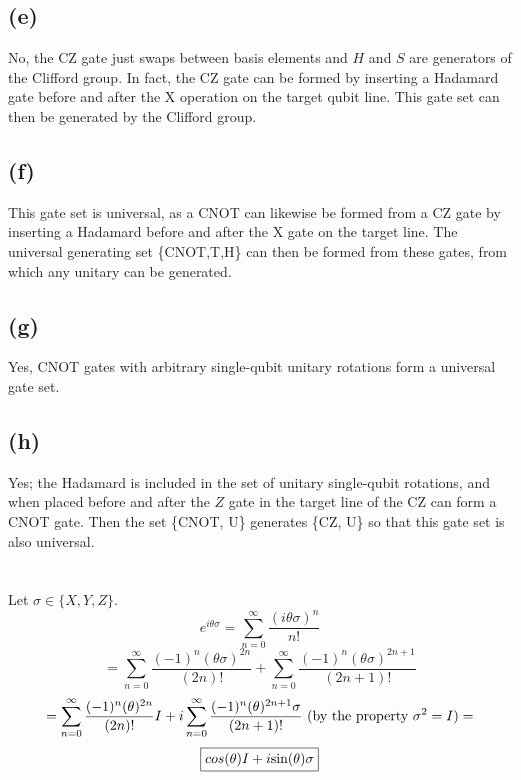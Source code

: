 \documentclass{article}
\begin{document}
\subsection*{(e)}

No, the CZ gate just swaps between basis elements and $H$ and $S$ are generators of the Clifford group. In fact, the CZ gate can be formed by inserting a Hadamard gate before and after the X operation on the target qubit line. This gate set can then be generated by the Clifford  group.

\subsection*{(f)}

This gate set is universal, as a CNOT can likewise be formed from a CZ gate by inserting a Hadamard before and after the X gate on the target line. The universal generating set \{CNOT,T,H\} can then be formed from these gates, from which any unitary can be generated.

\subsection*{(g)}

Yes, CNOT gates with arbitrary single-qubit unitary rotations form a universal gate set.

\subsection*{(h)}

Yes; the Hadamard is included in the set of unitary single-qubit rotations, and when placed before and after the $Z$ gate in the target line of the CZ can form a CNOT gate. Then the set \{CNOT, U\} generates \{CZ, U\} so that this gate set is also universal.

\section{}

Let $\sigma\in\{X,Y,Z\}$.
$$e^{i\theta\sigma}=\sum_{n=0}^{\infty}\frac{(i\theta\sigma)^n}{n!}$$
$$=\sum_{n=0}^{\infty}\frac{(-1)^n(\theta\sigma)^{2n}}{(2n)!}+\sum_{n=0}^{\infty}\frac{(-1)^n(\theta\sigma)^{2n+1}}{(2n+1)!}$$
$$=\sum_{n=0}^{\infty}\frac{(-1)^n(\theta)^{2n}}{(2n)!}I+i\sum_{n=0}^{\infty}\frac{(-1)^n(\theta)^{2n+1}\sigma}{(2n+1)!}\textnormal{ (by the property }\sigma^2=I)=$$
$$
\boxed{cos(\theta)I+i\textnormal{sin}(\theta)\sigma}
$$
\end{document}
